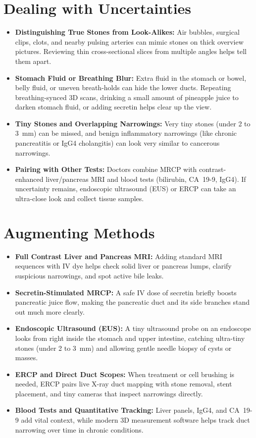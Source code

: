 \section{Dealing with Uncertainties}
\begin{itemize}
\item \textbf{Distinguishing True Stones from Look-Alikes:} Air bubbles, surgical clips, clots, and nearby pulsing arteries can mimic stones on thick overview pictures. Reviewing thin cross-sectional slices from multiple angles helps tell them apart.
\item \textbf{Stomach Fluid or Breathing Blur:} Extra fluid in the stomach or bowel, belly fluid, or uneven breath-holds can hide the lower ducts. Repeating breathing-synced 3D scans, drinking a small amount of pineapple juice to darken stomach fluid, or adding secretin helps clear up the view.
\item \textbf{Tiny Stones and Overlapping Narrowings:} Very tiny stones (under 2 to 3~mm) can be missed, and benign inflammatory narrowings (like chronic pancreatitis or IgG4 cholangitis) can look very similar to cancerous narrowings.
\item \textbf{Pairing with Other Tests:} Doctors combine MRCP with contrast-enhanced liver/pancreas MRI and blood tests (bilirubin, CA~19-9, IgG4). If uncertainty remains, endoscopic ultrasound (EUS) or ERCP can take an ultra-close look and collect tissue samples.
\end{itemize}

\section{Augmenting Methods}
\begin{itemize}
\item \textbf{Full Contrast Liver and Pancreas MRI:} Adding standard MRI sequences with IV dye helps check solid liver or pancreas lumps, clarify suspicious narrowings, and spot active bile leaks.
\item \textbf{Secretin-Stimulated MRCP:} A safe IV dose of secretin briefly boosts pancreatic juice flow, making the pancreatic duct and its side branches stand out much more clearly.
\item \textbf{Endoscopic Ultrasound (EUS):} A tiny ultrasound probe on an endoscope looks from right inside the stomach and upper intestine, catching ultra-tiny stones (under 2 to 3~mm) and allowing gentle needle biopsy of cysts or masses.
\item \textbf{ERCP and Direct Duct Scopes:} When treatment or cell brushing is needed, ERCP pairs live X-ray duct mapping with stone removal, stent placement, and tiny cameras that inspect narrowings directly.
\item \textbf{Blood Tests and Quantitative Tracking:} Liver panels, IgG4, and CA~19-9 add vital context, while modern 3D measurement software helps track duct narrowing over time in chronic conditions.
\end{itemize}

